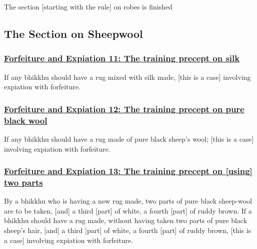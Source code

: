 \begin{center}
	The section [starting with the rule] on robes is finished
\end{center}



\setsubsecheadstyle{\subsectionFmt}
\subsection{The Section on Sheepwool}

\subsubsection*{\hyperref[np11]{Forfeiture and Expiation 11: The training precept on silk}}
\label{forf-exp11}

If any bhikkhu should have a rug mixed with silk made, [this is a case] involving expiation with forfeiture.



\subsubsection*{\hyperref[np12]{Forfeiture and Expiation 12: The training precept on pure black wool}}
\label{forf-exp12}

If any bhikkhu should have a rug made of pure black sheep's wool; [this is a case] involving expiation with forfeiture.



\subsubsection*{\hyperref[np13]{Forfeiture and Expiation 13: The training precept on [using] two parts}}
\label{forf-exp13}

By a bhikkhu who is having a new rug made, two parts of pure black sheep-wool are to be taken, [and] a third [part] of white, a fourth [part] of ruddy brown. If a bhikkhu should have a rug made, without having taken two parts of pure black sheep's hair, [and] a third [part] of white, a fourth [part] of ruddy brown, [this is a case] involving expiation with forfeiture.



